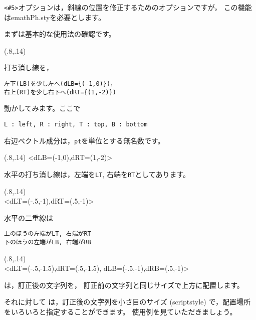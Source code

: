 \documentclass[fleqn,a4j]{jarticle}
\makeatletter
\newcommand{\cindex}[1]{\index{#1@\texttt{\protect\cmd{#1}}}}
\makeatother
\begin{document}
\verb+<#5>+オプションは，斜線の位置を修正するためのオプションですが，
この機能は\textsf{emathPh.sty}を必要とします。

まずは基本的な使用法の確認です。

\begin{showEx}(.8,.14){}
\end{showEx}

打ち消し線を，
\begin{jquote}
\begin{verbatim}
左下(LB)を少し左へ(dLB={(-1,0)})，
右上(RT)を少し右下へ(dRT={(1,-2)})
\end{verbatim}
\end{jquote}
動かしてみます。ここで
\begin{jquote}
\begin{verbatim}
L : left, R : right, T : top, B : bottom
\end{verbatim}
\end{jquote}
右辺ベクトル成分は，\verb+pt+を単位とする無名数です。

\begin{showEx}(.8,.14){}
<dLB={(-1,0)},dRT={(1,-2)}>
\end{showEx}

水平の打ち消し線は，左端を\verb+LT+, 右端を\verb+RT+としてあります。

\begin{showEx}(.8,.14){}
\\
<dLT={(-.5,-1)},dRT={(.5,-1)}>
\end{showEx}
\clearpage

水平の二重線は
\begin{jquote}
\begin{verbatim}
上のほうの左端がLT, 右端がRT
下のほうの左端がLB, 右端がRB
\end{verbatim}
\end{jquote}

\begin{showEx}(.8,.14){}
\\
<dLT={(-.5,-1.5)},dRT={(.5,-1.5)},%
               dLB={(-.5,-1)},dRB={(.5,-1)}>
\end{showEx}

\bigskip

 は，訂正後の文字列を，
訂正前の文字列と同じサイズで上方に配置します。

それに対して  は，訂正後の文字列を小さ目のサイズ (scriptstyle)
で，配置場所をいろいろと指定することができます。\cindex{Teisei}
使用例を見ていただきましょう。
\end{document}
